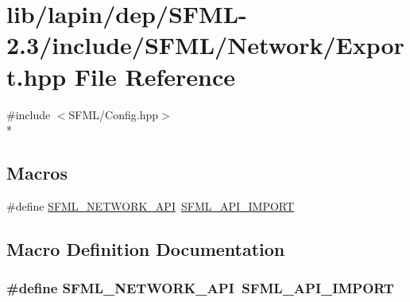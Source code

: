 \hypertarget{lapin_2dep_2_s_f_m_l-2_83_2include_2_s_f_m_l_2_network_2_export_8hpp}{\section{lib/lapin/dep/\-S\-F\-M\-L-\/2.3/include/\-S\-F\-M\-L/\-Network/\-Export.hpp File Reference}
\label{lapin_2dep_2_s_f_m_l-2_83_2include_2_s_f_m_l_2_network_2_export_8hpp}
}
{\ttfamily \#include $<$S\-F\-M\-L/\-Config.\-hpp$>$}\\*
\subsection*{Macros}
\begin{DoxyCompactItemize}
\item 
\#define \hyperlink{lapin_2dep_2_s_f_m_l-2_83_2include_2_s_f_m_l_2_network_2_export_8hpp_ac5d46d4ffd98e947e28c54d051b338e7}{S\-F\-M\-L\-\_\-\-N\-E\-T\-W\-O\-R\-K\-\_\-\-A\-P\-I}~\hyperlink{sfml_2dep_2_s_f_m_l-2_84_82_2include_2_s_f_m_l_2_config_8hpp_aba0bbe5791bee6633caa835c7f6a12a4}{S\-F\-M\-L\-\_\-\-A\-P\-I\-\_\-\-I\-M\-P\-O\-R\-T}
\end{DoxyCompactItemize}


\subsection{Macro Definition Documentation}
\hypertarget{lapin_2dep_2_s_f_m_l-2_83_2include_2_s_f_m_l_2_network_2_export_8hpp_ac5d46d4ffd98e947e28c54d051b338e7}{
\subsubsection[{S\-F\-M\-L\-\_\-\-N\-E\-T\-W\-O\-R\-K\-\_\-\-A\-P\-I}]{\setlength{\rightskip}{0pt plus 5cm}\#define S\-F\-M\-L\-\_\-\-N\-E\-T\-W\-O\-R\-K\-\_\-\-A\-P\-I~{\bf S\-F\-M\-L\-\_\-\-A\-P\-I\-\_\-\-I\-M\-P\-O\-R\-T}}}\label{lapin_2dep_2_s_f_m_l-2_83_2include_2_s_f_m_l_2_network_2_export_8hpp_ac5d46d4ffd98e947e28c54d051b338e7}
